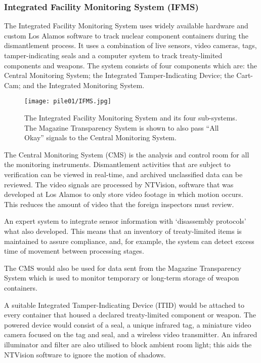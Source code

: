 \documentclass[twoside,titlepage,11pt,twocolumn,a4paper]{article}
\begin{document}
\subsubsection{Integrated Facility Monitoring System (IFMS)}
The Integrated Facility Monitoring System uses widely available 
hardware and custom Los Alamos software to track nuclear component 
containers during the dismantlement process. It uses a combination 
of live sensors, video cameras, tags, tamper-indicating seals and 
a computer system to track treaty-limited components and weapons. 
The system consists of four components which are: the Central 
Monitoring System; the Integrated Tamper-Indicating Device; 
the Cart-Cam; and the Integrated Monitoring System. 

\begin{figure}
  \texttt{[image: pile01/IFMS.jpg]}
  \caption{The Integrated Facility Monitoring System and its four
    sub-systems. The Magazine Transparency System is shown to also
    pass ``All Okay'' signals to the Central Monitoring System.
    \citep{gerdes2001}}
\end{figure}

The Central Monitoring System (CMS) is the analysis and control 
room for all the monitoring instruments. Dismantlement activities 
that are subject to verification can be viewed in real-time, and 
archived unclassified data can be reviewed. The video signals are 
processed by NTVision, software that was developed at Los Alamos 
to only store video footage in which motion occurs. This reduces 
the amount of video that the foreign inspectors must review.

An expert system to integrate sensor information with `disassembly 
protocols' what also developed. This means that an inventory of 
treaty-limited items is maintained to assure compliance, and, for 
example, the system can detect excess time of movement between 
processing stages.

The CMS would also be used for data sent from the Magazine 
Transparency System which is used to monitor temporary or 
long-term storage of weapon containers.

A suitable Integrated Tamper-Indicating Device (ITID) would be 
attached to every container that housed a declared treaty-limited 
component or weapon. The powered device would consist of a seal, 
a unique infrared tag, a miniature video camera focused on the tag 
and seal, and a wireless video transmitter. An infrared illuminator 
and filter are also utilised to block ambient room light; this aids 
the NTVision software to ignore the motion of shadows.
\end{document}
